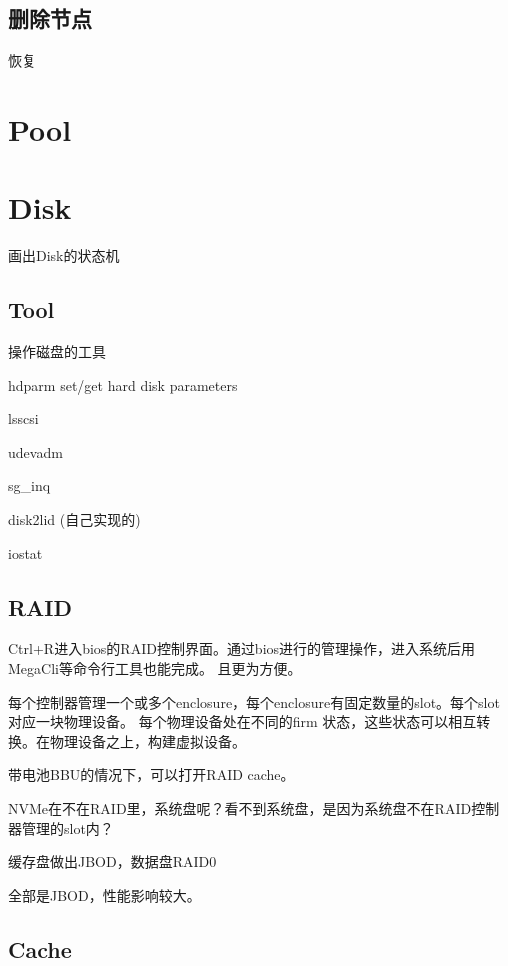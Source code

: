 \subsection{删除节点}

恢复


\section{Pool}

\section{Disk}

画出Disk的状态机

\subsection{Tool}

操作磁盘的工具
\begin{enumbox}
\item hdparm set/get hard disk parameters
\item lsscsi
\item udevadm
\item sg\_inq
\item disk2lid (自己实现的)
\item iostat
\end{enumbox}

\subsection{RAID}

Ctrl+R进入bios的RAID控制界面。通过bios进行的管理操作，进入系统后用MegaCli等命令行工具也能完成。
且更为方便。

每个控制器管理一个或多个enclosure，每个enclosure有固定数量的slot。每个slot对应一块物理设备。
每个物理设备处在不同的firm 状态，这些状态可以相互转换。在物理设备之上，构建虚拟设备。

带电池BBU的情况下，可以打开RAID cache。

NVMe在不在RAID里，系统盘呢？看不到系统盘，是因为系统盘不在RAID控制器管理的slot内？

缓存盘做出JBOD，数据盘RAID0

全部是JBOD，性能影响较大。

\subsection{Cache}

